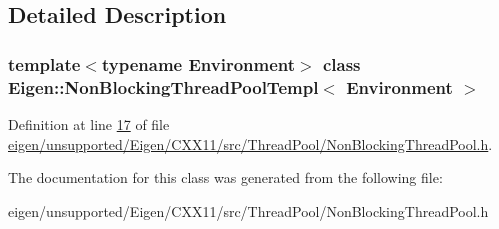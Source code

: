 \subsection{Detailed Description}
\subsubsection*{template$<$typename Environment$>$\newline
class Eigen\+::\+Non\+Blocking\+Thread\+Pool\+Templ$<$ Environment $>$}



Definition at line \hyperlink{eigen_2unsupported_2_eigen_2_c_x_x11_2src_2_thread_pool_2_non_blocking_thread_pool_8h_source_l00017}{17} of file \hyperlink{eigen_2unsupported_2_eigen_2_c_x_x11_2src_2_thread_pool_2_non_blocking_thread_pool_8h_source}{eigen/unsupported/\+Eigen/\+C\+X\+X11/src/\+Thread\+Pool/\+Non\+Blocking\+Thread\+Pool.\+h}.



The documentation for this class was generated from the following file\+:\begin{DoxyCompactItemize}
\item 
eigen/unsupported/\+Eigen/\+C\+X\+X11/src/\+Thread\+Pool/\+Non\+Blocking\+Thread\+Pool.\+h\end{DoxyCompactItemize}
